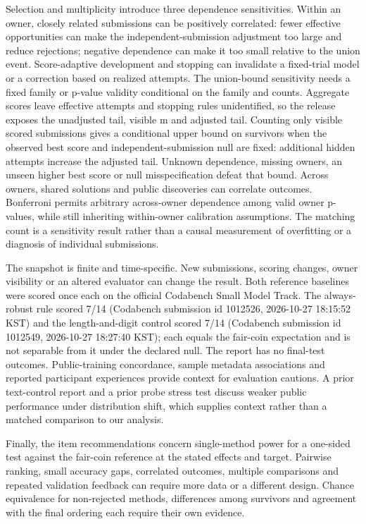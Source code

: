 Selection and multiplicity introduce three dependence sensitivities. Within an owner, closely related submissions can be positively correlated: fewer effective opportunities can make the independent-submission adjustment too large and reduce rejections; negative dependence can make it too small relative to the union event. Score-adaptive development and stopping can invalidate a fixed-trial model or a correction based on realized attempts. The union-bound sensitivity needs a fixed family or p-value validity conditional on the family and counts. Aggregate scores leave effective attempts and stopping rules unidentified, so the release exposes the unadjusted tail, visible m and adjusted tail. Counting only visible scored submissions gives a conditional upper bound on survivors when the observed best score and independent-submission null are fixed: additional hidden attempts increase the adjusted tail. Unknown dependence, missing owners, an unseen higher best score or null misspecification defeat that bound. Across owners, shared solutions and public discoveries can correlate outcomes. Bonferroni permits arbitrary across-owner dependence among valid owner p-values, while still inheriting within-owner calibration assumptions. The matching count is a sensitivity result rather than a causal measurement of overfitting or a diagnosis of individual submissions.


The snapshot is finite and time-specific. New submissions, scoring changes, owner visibility or an altered evaluator can change the result. Both reference baselines were scored once each on the official Codabench Small Model Track. The always-robust rule scored 7/14 (Codabench submission id 1012526, 2026-10-27 18:15:52 KST) and the length-and-digit control scored 7/14 (Codabench submission id 1012549, 2026-10-27 18:27:40 KST); each equals the fair-coin expectation and is not separable from it under the declared null. The report has no final-test outcomes. Public-training concordance, sample metadata associations and reported participant experiences provide context for evaluation cautions. A prior text-control report and a prior probe stress test discuss weaker public performance under distribution shift, which supplies context rather than a matched comparison to our analysis. \citep{S8,S9}


Finally, the item recommendations concern single-method power for a one-sided test against the fair-coin reference at the stated effects and target. Pairwise ranking, small accuracy gaps, correlated outcomes, multiple comparisons and repeated validation feedback can require more data or a different design. Chance equivalence for non-rejected methods, differences among survivors and agreement with the final ordering each require their own evidence.


